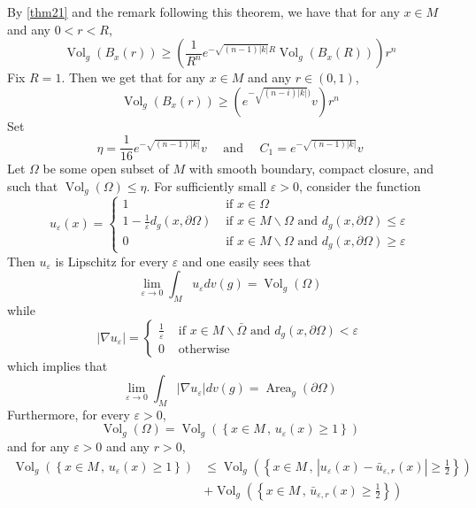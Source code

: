 \documentclass[12pt,hyperref,a4paper,UTF8]{ctexart}
\begin{document}
\begin{Proof}
    By \autoref{thm21} and the remark following this theorem, we have that for any $x \in M$ and any $0<r<R$,
$$
\operatorname{Vol}_g\left(B_x(r)\right) \geq\left(\frac{1}{R^n} e^{-\sqrt{(n-1)|k|} R} \operatorname{Vol}_g\left(B_x(R)\right)\right) r^{n}
$$
Fix $R=1$. Then we get that for any $x \in M$ and any $r \in(0,1)$,
$$
\operatorname{Vol}_g\left(B_x(r)\right) \geq\left(e^{-\sqrt{(n-i)|k|})} v\right) r^n
$$
Set
$$
\eta=\frac{1}{16} e^{-\sqrt{(n-1)|k|}} v \quad \text { and } \quad C_1=e^{-\sqrt{(n-1)|k|}} v
$$
Let $\Omega$ be some open subset of $M$ with smooth boundary, compact closure, and such that $\operatorname{Vol}_g(\Omega) \leq \eta$. For sufficiently small $\varepsilon>0$, consider the function
$$
u_{\varepsilon}(x)=\left\{\begin{array}{ll}
1 & \text { if } x \in \Omega \\
1-\frac{1}{\varepsilon} d_g(x, \partial \Omega) & \text { if } x \in M \backslash \Omega \text { and } d_g(x, \partial \Omega) \leq \varepsilon \\
0 & \text { if } x \in M \backslash \Omega \text { and } d_g(x, \partial \Omega) \geq \varepsilon
\end{array}\right.
$$
Then $u_{\varepsilon}$ is Lipschitz for every $\varepsilon$ and one easily sees that
$$
\lim _{\varepsilon \rightarrow 0} \int_M u_{\varepsilon} d v(g)=\operatorname{Vol}_g(\Omega)
$$
while
$$
\left|\nabla u_{\varepsilon}\right|=\left\{\begin{array}{ll}
\frac{1}{\varepsilon} & \text { if } x \in M \backslash \bar{\Omega} \text { and } d_g(x, \partial \Omega)<\varepsilon \\
0 & \text { otherwise }
\end{array}\right.
$$
which implies that
$$
\lim _{\varepsilon \rightarrow 0} \int_M\left|\nabla u_{\varepsilon}\right| d v(g)=\operatorname{Area}_g(\partial \Omega)
$$
Furthermore, for every $\varepsilon>0$,
$$
\operatorname{Vol}_g(\Omega)=\operatorname{Vol}_g\left(\left\{x \in M \,,\, u_{\varepsilon}(x) \geq 1\right\}\right)
$$
and for any $\varepsilon>0$ and any $r>0$,
$$
\begin{aligned}
\operatorname{Vol}_g\left(\left\{x \in M \,,\, u_{\varepsilon}(x) \geq 1\right\}\right) &\leq  \operatorname{Vol}_g\left(\left\{x \in M \,,\,\left|u_{\varepsilon}(x)-\bar{u}_{\varepsilon, r}(x)\right| \geq \frac{1}{2}\right\}\right) \\
& +\operatorname{Vol}_g\left(\left\{x \in M \,,\, \bar{u}_{\varepsilon, r}(x) \geq \frac{1}{2}\right\}\right)

\end{aligned}$$
\end{Proof}
\end{document}

